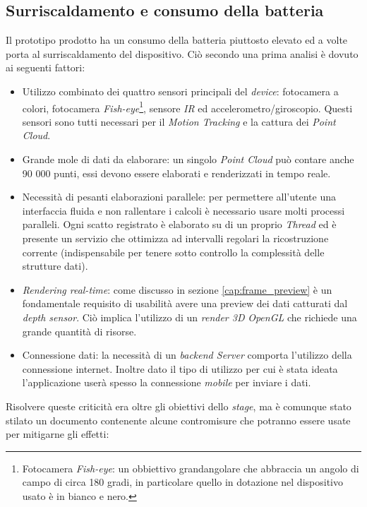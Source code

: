 \subsection{Surriscaldamento e consumo della batteria}
Il prototipo prodotto ha un consumo della batteria piuttosto elevato ed a volte porta al surriscaldamento del dispositivo.
Ciò secondo una prima analisi è dovuto ai seguenti fattori:
\begin{itemize}
	\item Utilizzo combinato dei quattro sensori principali del \emph{device}: fotocamera a colori, fotocamera \emph{Fish-eye}\footnote{Fotocamera \emph{Fish-eye}: un obbiettivo grandangolare che abbraccia un angolo di campo di circa 180 gradi, in particolare quello in dotazione nel dispositivo usato è in bianco e nero.}, sensore \emph{IR} ed accelerometro/giroscopio. Questi sensori sono tutti necessari per il \emph{Motion Tracking} e la cattura dei \emph{Point Cloud}.
	\item Grande mole di dati da elaborare: un singolo \emph{Point Cloud} può contare anche 90 000 punti, essi devono essere elaborati e renderizzati in tempo reale.	
	\item Necessità di pesanti elaborazioni parallele: per permettere all'utente una interfaccia fluida e non rallentare i calcoli è necessario usare molti processi paralleli. Ogni scatto registrato è elaborato su di un proprio \emph{Thread} ed è presente un servizio che ottimizza ad intervalli regolari la ricostruzione corrente (indispensabile per tenere sotto controllo la complessità delle strutture dati).
	\item \emph{Rendering real-time}: come discusso in sezione \ref{cap:frame_preview} è un fondamentale requisito di usabilità avere una preview dei dati catturati dal \emph{depth sensor}. Ciò implica l'utilizzo di un \emph{render 3D} \emph{OpenGL} che richiede una grande quantità di risorse.
	\item Connessione dati: la necessità di un \emph{backend Server} comporta l'utilizzo della connessione internet. Inoltre dato il tipo di utilizzo per cui è stata ideata l'applicazione userà spesso la connessione \emph{mobile} per inviare i dati.
\end{itemize}
Risolvere queste criticità era oltre gli obiettivi dello \emph{stage}, ma è comunque stato stilato un documento contenente alcune contromisure che potranno essere usate per mitigarne gli effetti:
